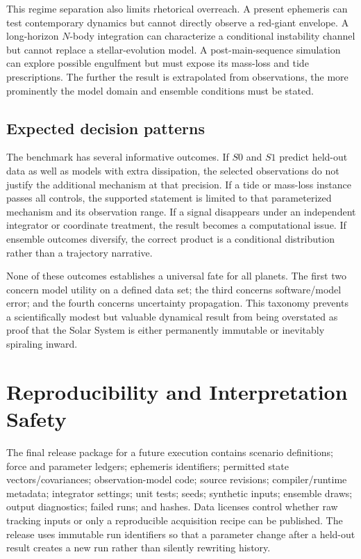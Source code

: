 \documentclass[10pt,conference]{IEEEtran}
\begin{document}
This regime separation also limits rhetorical overreach. A present ephemeris can test contemporary dynamics but cannot directly observe a red-giant envelope. A long-horizon $N$-body integration can characterize a conditional instability channel but cannot replace a stellar-evolution model. A post-main-sequence simulation can explore possible engulfment but must expose its mass-loss and tide prescriptions. The further the result is extrapolated from observations, the more prominently the model domain and ensemble conditions must be stated.

\subsection{Expected decision patterns}

The benchmark has several informative outcomes. If $S0$ and $S1$ predict held-out data as well as models with extra dissipation, the selected observations do not justify the additional mechanism at that precision. If a tide or mass-loss instance passes all controls, the supported statement is limited to that parameterized mechanism and its observation range. If a signal disappears under an independent integrator or coordinate treatment, the result becomes a computational issue. If ensemble outcomes diversify, the correct product is a conditional distribution rather than a trajectory narrative.

None of these outcomes establishes a universal fate for all planets. The first two concern model utility on a defined data set; the third concerns software/model error; and the fourth concerns uncertainty propagation. This taxonomy prevents a scientifically modest but valuable dynamical result from being overstated as proof that the Solar System is either permanently immutable or inevitably spiraling inward.

\section{Reproducibility and Interpretation Safety}
\label{sec:reproducibility}

The final release package for a future execution contains scenario definitions; force and parameter ledgers; ephemeris identifiers; permitted state vectors/covariances; observation-model code; source revisions; compiler/runtime metadata; integrator settings; unit tests; seeds; synthetic inputs; ensemble draws; output diagnostics; failed runs; and hashes. Data licenses control whether raw tracking inputs or only a reproducible acquisition recipe can be published. The release uses immutable run identifiers so that a parameter change after a held-out result creates a new run rather than silently rewriting history.
\end{document}
